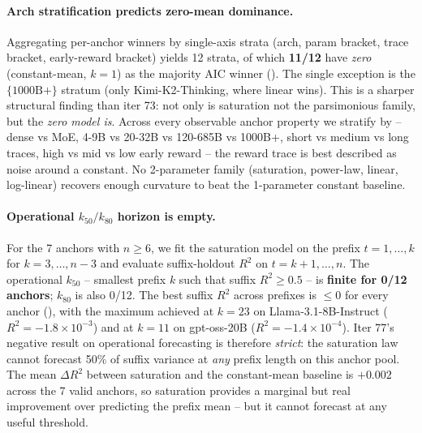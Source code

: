 \paragraph{Arch stratification predicts zero-mean dominance.}
\label{par:scaling-iter81-stratum}
Aggregating per-anchor winners by single-axis strata (arch, param
bracket, trace bracket, early-reward bracket) yields 12 strata, of
which \textbf{11/12} have \emph{zero} (constant-mean, $k=1$) as the
majority AIC winner ().  The single
exception is the $\{1000\mathrm{B}+\}$ stratum (only Kimi-K2-Thinking,
where linear wins).  This is a sharper structural finding than iter
73: not only is saturation not the parsimonious family, but the
\emph{zero model is}.  Across every observable anchor property we
stratify by -- dense vs MoE, 4-9B vs 20-32B vs 120-685B vs 1000B+,
short vs medium vs long traces, high vs mid vs low early reward --
the reward trace is best described as noise around a constant.
No 2-parameter family (saturation, power-law, linear, log-linear)
recovers enough curvature to beat the 1-parameter constant baseline.

\paragraph{Operational $k_{50}/k_{80}$ horizon is empty.}
\label{par:scaling-iter81-horizon}
For the 7 anchors with $n \ge 6$, we fit the saturation model on the
prefix $t = 1, \dots, k$ for $k = 3, \dots, n-3$ and evaluate
suffix-holdout $R^2$ on $t = k+1, \dots, n$.  The operational
$k_{50}$ -- smallest prefix $k$ such that suffix $R^2 \ge 0.5$ -- is
\textbf{finite for 0/12 anchors}; $k_{80}$ is also 0/12.  The best
suffix $R^2$ across prefixes is $\le 0$ for every anchor
(), with the maximum achieved at $k=23$
on Llama-3.1-8B-Instruct ($R^2 = -1.8 \times 10^{-3}$) and at $k=11$
on gpt-oss-20B ($R^2 = -1.4 \times 10^{-4}$).  Iter 77's negative
result on operational forecasting is therefore \emph{strict}: the
saturation law cannot forecast 50\% of suffix variance at \emph{any}
prefix length on this anchor pool.  The mean $\Delta R^2$ between
saturation and the constant-mean baseline is $+0.002$ across the 7
valid anchors, so saturation provides a marginal but real improvement
over predicting the prefix mean -- but it cannot forecast at any
useful threshold.

